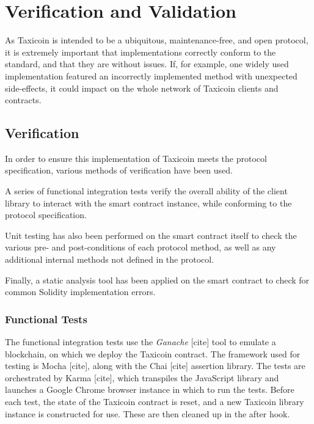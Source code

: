 \section{Verification and Validation}

As Taxicoin is intended to be a ubiquitous, maintenance-free, and open protocol, it is extremely important that implementations correctly conform to the standard, and that they are without issues. If, for example, one widely used implementation featured an incorrectly implemented method with unexpected side-effects, it could impact on the whole network of Taxicoin clients and contracts.

\subsection{Verification}


In order to ensure this implementation of Taxicoin meets the protocol specification, various methods of verification have been used.

A series of functional integration tests verify the overall ability of the client library to interact with the smart contract instance, while conforming to the protocol specification.

Unit testing has also been performed on the smart contract itself to check the various pre- and post-conditions of each protocol method, as well as any additional internal methods not defined in the protocol.

Finally, a static analysis tool has been applied on the smart contract to check for common Solidity implementation errors.

\subsubsection{Functional Tests}


The functional integration tests use the \textit{Ganache} [cite] tool to emulate a blockchain, on which we deploy the Taxicoin contract. The framework used for testing is Mocha [cite], along with the Chai [cite] assertion library. The tests are orchestrated by Karma [cite], which transpiles the JavaScript library and launches a Google Chrome browser instance in which to run the tests. Before each test, the state of the Taxicoin contract is reset, and a new Taxicoin library instance is constructed for use. These are then cleaned up in the after hook.

